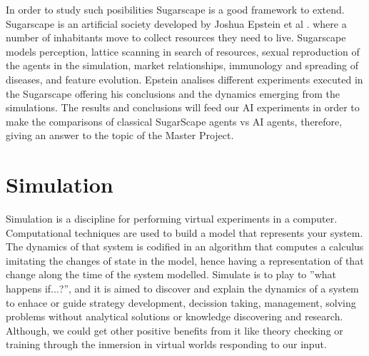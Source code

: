 \documentclass[11pt,oneside,a4paper,openright]{report}
\begin{document}
In order to study such posibilities Sugarscape is a good framework to extend. Sugarscape is an artificial society developed by Joshua Epstein et al \cite{EpsteinAxtell}. where a number of inhabitants move to collect resources they need to live. Sugarscape models perception, lattice scanning in search of resources, sexual reproduction of the agents in the simulation, market relationships, immunology and spreading of diseases, and feature evolution. Epstein analises different experiments executed in the Sugarscape offering his conclusions and the dynamics emerging from the simulations. The results and conclusions will feed our AI experiments in order to make the comparisons of classical SugarScape agents vs AI agents, therefore, giving an answer to the topic of the Master Project.

\section{Simulation}

Simulation is a discipline for performing virtual experiments in a computer. Computational techniques are used to build a model that represents your system. The dynamics of that system is codified in an algorithm that computes a calculus imitating the changes of state in the model, hence having a representation of that change along the time of the system modelled. Simulate is to play to ''what happens if...?'', and it is aimed to discover and explain the dynamics of a system to enhace or guide strategy development, decission taking, management, solving problems without analytical solutions or knowledge discovering and research. Although, we could get other positive benefits from it like theory checking or training through the inmersion in virtual worlds responding to our input.
\end{document}
